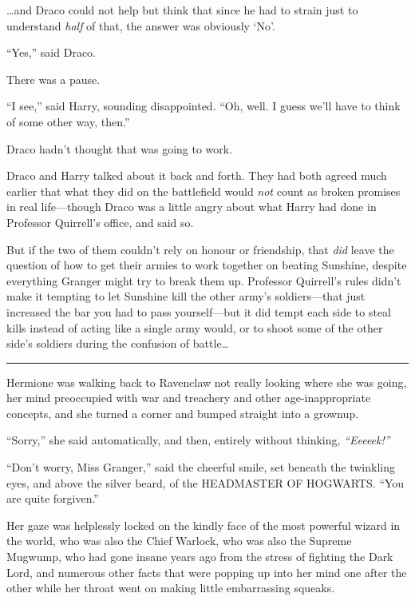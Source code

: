\ldots{}and Draco could not help but think that since he had to strain
just to understand \emph{half} of that, the answer was obviously `No'.

``Yes,'' said Draco.

There was a pause.

``I see,'' said Harry, sounding disappointed. ``Oh, well. I guess we'll
have to think of some other way, then.''

Draco hadn't thought that was going to work.

Draco and Harry talked about it back and forth. They had both agreed
much earlier that what they did on the battlefield would \emph{not}
count as broken promises in real life---though Draco was a little angry
about what Harry had done in Professor Quirrell's office, and said so.

But if the two of them couldn't rely on honour or friendship, that
\emph{did} leave the question of how to get their armies to work
together on beating Sunshine, despite everything Granger might try to
break them up. Professor Quirrell's rules didn't make it tempting to let
Sunshine kill the other army's soldiers---that just increased the bar
you had to pass yourself---but it did tempt each side to steal kills
instead of acting like a single army would, or to shoot some of the
other side's soldiers during the confusion of battle\ldots{}

\begin{center}\rule{3in}{0.4pt}\end{center}

Hermione was walking back to Ravenclaw not really looking where she was
going, her mind preoccupied with war and treachery and other
age-inappropriate concepts, and she turned a corner and bumped straight
into a grownup.

``Sorry,'' she said automatically, and then, entirely without thinking,
\emph{``Eeeeek!''}

``Don't worry, Miss Granger,'' said the cheerful smile, set beneath the
twinkling eyes, and above the silver beard, of the HEADMASTER OF
HOGWARTS. ``You are quite forgiven.''

Her gaze was helplessly locked on the kindly face of the most powerful
wizard in the world, who was also the Chief Warlock, who was also the
Supreme Mugwump, who had gone insane years ago from the stress of
fighting the Dark Lord, and numerous other facts that were popping up
into her mind one after the other while her throat went on making little
embarrassing squeaks.

